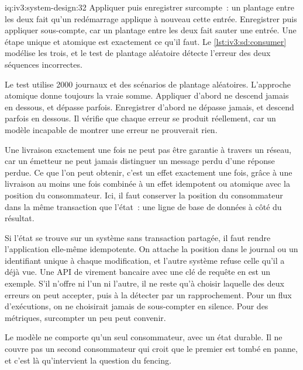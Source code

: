 \begin{solution}{iq:iv3:system-design:32}
Appliquer puis enregistrer surcompte~: un plantage entre les deux fait qu'un redémarrage applique à nouveau cette entrée. Enregistrer puis appliquer sous-compte, car un plantage entre les deux fait sauter une entrée. Une étape unique et atomique est exactement ce qu'il faut. Le \cref{lst:iv3:sd:consumer} modélise les trois, et le test de plantage aléatoire détecte l'erreur des deux séquences incorrectes.
\label{lst:iv3:sd:consumer}

Le test utilise 2000 journaux et des scénarios de plantage aléatoires. L'approche atomique donne toujours la vraie somme. Appliquer d'abord ne descend jamais en dessous, et dépasse parfois. Enregistrer d'abord ne dépasse jamais, et descend parfois en dessous. Il vérifie que chaque erreur se produit réellement, car un modèle incapable de montrer une erreur ne prouverait rien.

Une livraison exactement une fois ne peut pas être garantie à travers un réseau, car un émetteur ne peut jamais distinguer un message perdu d'une réponse perdue. Ce que l'on peut obtenir, c'est un effet exactement une fois, grâce à une livraison au moins une fois combinée à un effet idempotent ou atomique avec la position du consommateur. Ici, il faut conserver la position du consommateur dans la même transaction que l'état~: une ligne de base de données à côté du résultat.

Si l'état se trouve sur un système sans transaction partagée, il faut rendre l'application elle-même idempotente. On attache la position dans le journal ou un identifiant unique à chaque modification, et l'autre système refuse celle qu'il a déjà vue. Une API de virement bancaire avec une clé de requête en est un exemple. S'il n'offre ni l'un ni l'autre, il ne reste qu'à choisir laquelle des deux erreurs on peut accepter, puis à la détecter par un rapprochement. Pour un flux d'exécutions, on ne choisirait jamais de sous-compter en silence. Pour des métriques, surcompter un peu peut convenir.

Le modèle ne comporte qu'un seul consommateur, avec un état durable. Il ne couvre pas un second consommateur qui croit que le premier est tombé en panne, et c'est là qu'intervient la question du fencing.

\end{solution}

